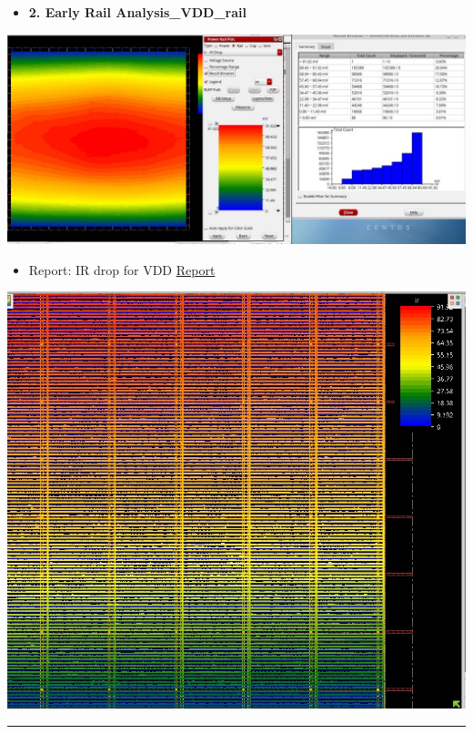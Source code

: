 \documentclass[a4paper]{article}
\begin{document}
\begin{itemize}
\item \textbf{\textbf{2. Early Rail Analysis\_VDD\_rail}}
\end{itemize}
\begin{center}
\includegraphics[width=.9\linewidth]{./img/gemmini_era2_vddd.jpg}
\end{center}
\begin{itemize}
\item Report: IR drop for VDD \href{./rep/VDD.main.html}{Report}
\end{itemize}
\begin{center}
\includegraphics[width=.9\linewidth]{./img/gemmini_era2_vdd.jpg}
\end{center}






\noindent\rule{\textwidth}{0.5pt}
\end{document}
